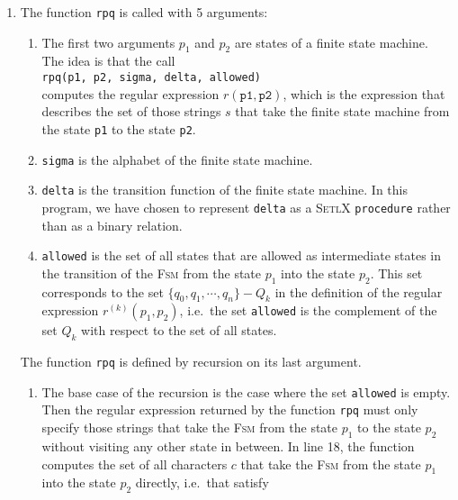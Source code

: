 \begin{enumerate}
\item The function \texttt{rpq} is called with 5 arguments:
      \begin{enumerate}
      \item The first two arguments $p_1$ and $p_2$ are states of a finite
            state machine.  The idea is that the call
            \\[0.2cm]
            \hspace*{1.3cm}
            \texttt{rpq(p1, p2, sigma, delta, allowed)}
            \\[0.2cm]
            computes the regular expression $r(\texttt{p1}, \texttt{p2})$, which is the
            expression that describes the set of those strings $s$ that take the
            finite state machine from the state \texttt{p1} to the state \texttt{p2}.
      \item \texttt{sigma} is the alphabet of the finite state machine.
      \item \texttt{delta} is the transition function of the finite state machine.
            In this program, we have chosen to represent \texttt{delta} as a \textsc{SetlX}
            \texttt{procedure} rather than as a binary relation.
      \item \texttt{allowed} is the set of all states that are allowed as intermediate states in the
             transition of the \textsc{Fsm} from the state $p_1$ into the state $p_2$.  This set
             corresponds to the set $\{q_0, q_1, \cdots, q_n\} - Q_{k}$ in the definition of the regular
             expression $r^{(k)}(p_1, p_2)$, i.e.~the set \texttt{allowed} is the complement of the
             set $Q_k$ with respect to the set of all states.
      \end{enumerate}
      The function \texttt{rpq} is defined by recursion on its last argument.  
      \begin{enumerate}
      \item The base case of the recursion is the case where the set \texttt{allowed} is
            empty.  Then the regular expression returned by the function \texttt{rpq} must
            only specify those strings that take the \textsc{Fsm} from the state $p_1$ to the state
            $p_2$ without visiting any other state in between.  
            In line 18, the function computes the set of all characters $c$ that take the \textsc{Fsm} from
            the state $p_1$ into the state $p_2$ directly, i.e.~that satisfy
            \\[0.2cm]
            \hspace*{1.3cm}

\end{enumerate}
\end{enumerate}
